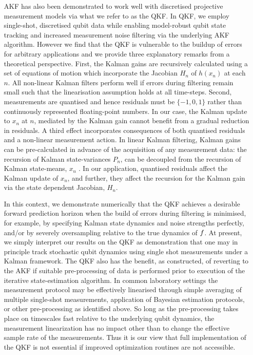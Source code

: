 AKF has also been demonstrated to work well with discretised projective measurement models via what we refer to as the QKF.  In QKF, we employ single-shot, discretised qubit data while enabling model-robust qubit state tracking and increased measurement noise filtering via the underlying AKF algorithm.  However we find that the QKF is vulnerable to the buildup of errors for arbitrary applications and we provide three explanatory remarks from a theoretical perspective. First, the Kalman gains are recursively calculated using a set of  equations of motion which incorporate the Jacobian $H_n$ of $h(x_n)$ at each $n$. All non-linear Kalman filters perform well if errors during filtering remain small such that the linearisation assumption holds at all time-steps. Second, measurements are quantised and hence residuals must be $\{-1, 0, 1 \}$ rather than continuously represented floating-point numbers.  In our case, the Kalman update to $x_n$ at $n$, mediated by the Kalman gain cannot benefit from a gradual reduction in residuals.  A third effect incorporates consequences of both quantised residuals and a non-linear measurement action. In linear Kalman filtering, Kalman gains can be pre-calculated in advance of the acquisition of any measurement data: the recursion of Kalman state-variances $P_{n}$, can be decoupled from the recursion of Kalman state-means, $x_{n}$ \cite{grewal2001theory}.  In our application, quantised residuals affect the Kalman update of $x_{n}$, and further, they affect the recursion for the Kalman gain via the state dependent Jacobian, $H_n$. 

In this context, we demonstrate numerically that the QKF achieves a desirable forward prediction horizon when the build of errors during filtering is minimised, for example, by specifying Kalman state dynamics and noise strengths perfectly, and/or by severely oversampling relative to the true dynamics of $f$.   At present, we simply interpret our results on the QKF as demonstration that one may in principle track stochastic qubit dynamics using single shot measurements under a Kalman framework.  The QKF also has the benefit, as constructed, of reverting to the AKF if suitable pre-processing of data is performed prior to execution of the iterative state-estimation algorithm.  In common laboratory settings the measurement protocol may be effectively linearised through simple averaging of multiple single-shot measurements, application of Bayesian estimation protocols, or other pre-processing as identified above.  So long as the pre-processing takes place on timescales fast relative to the underlying qubit dynamics, the measurement linearization has no impact other than to change the effective sample rate of the measurements.  Thus it is our view that full implementation of the QKF is not essential if improved optimization routines are not accessible.

